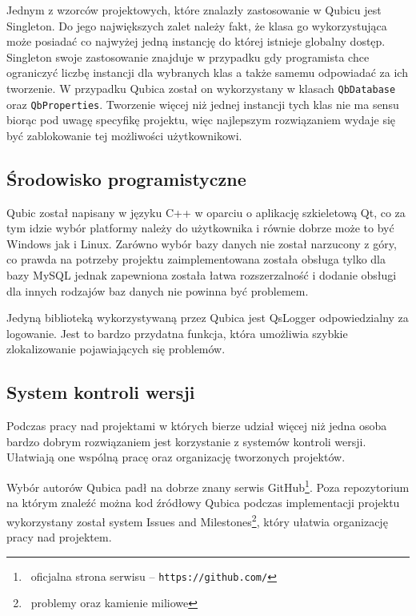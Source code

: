 \documentclass[12pt]{report}
\begin{document}
Jednym z wzorców projektowych, które znalazły zastosowanie w Qubicu jest Singleton. Do jego największych zalet należy fakt, że klasa go wykorzystująca może posiadać 
co najwyżej jedną instancję do której istnieje globalny dostęp. Singleton swoje zastosowanie znajduje w przypadku gdy programista chce ograniczyć liczbę instancji dla 
wybranych klas a także samemu odpowiadać za ich tworzenie. W przypadku Qubica został on wykorzystany w klasach {\tt QbDatabase} oraz {\tt QbProperties}. Tworzenie 
więcej niż jednej instancji tych klas nie ma sensu biorąc pod uwagę specyfikę projektu, więc najlepszym rozwiązaniem wydaje się być zablokowanie tej możliwości użytkownikowi. 

\subsection{Środowisko programistyczne}

Qubic został napisany w języku C++ w oparciu o aplikację szkieletową Qt, co za tym idzie wybór platformy należy do użytkownika i równie dobrze może to być Windows jak i Linux.
Zarówno wybór bazy danych nie został narzucony z góry, co prawda na potrzeby projektu zaimplementowana została obsługa tylko dla bazy MySQL jednak zapewniona została 
łatwa rozszerzalność i dodanie obsługi dla innych rodzajów baz danych nie powinna być problemem.

Jedyną biblioteką wykorzystywaną przez Qubica jest QsLogger odpowiedzialny za logowanie. Jest to bardzo przydatna funkcja, która umożliwia szybkie zlokalizowanie pojawiających
się problemów.

\subsection{System kontroli wersji}

Podczas pracy nad projektami w których bierze udział więcej niż jedna osoba bardzo dobrym rozwiązaniem jest korzystanie z systemów kontroli wersji. Ułatwiają one wspólną
pracę oraz organizację tworzonych projektów.

Wybór autorów Qubica padł na dobrze znany serwis GitHub\footnote{~oficjalna strona serwisu -- \tt https://github.com/}. Poza repozytorium na którym znaleźć można kod 
źródłowy Qubica podczas implementacji projektu wykorzystany został system Issues and Milestones\footnote{~problemy oraz kamienie miliowe}, który ułatwia organizację pracy 
nad projektem.
\end{document}
